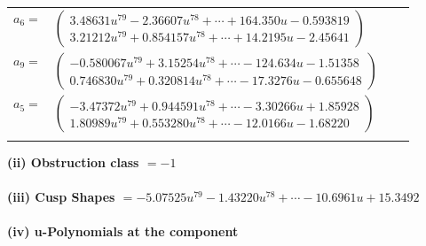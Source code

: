 \documentclass[1p]{elsarticle_modified}
\theoremstyle{definition}
\begin{document}
\begin{tabular}{m{7pt} m{180pt} m{7pt} m{180pt} }
\flushright $a_{6}=$&$\begin{pmatrix}3.48631 u^{79}-2.36607 u^{78}+\cdots+164.350 u-0.593819\\3.21212 u^{79}+0.854157 u^{78}+\cdots+14.2195 u-2.45641\end{pmatrix}$ \\
\flushright $a_{9}=$&$\begin{pmatrix}-0.580067 u^{79}+3.15254 u^{78}+\cdots-124.634 u-1.51358\\0.746830 u^{79}+0.320814 u^{78}+\cdots-17.3276 u-0.655648\end{pmatrix}$ \\
\flushright $a_{5}=$&$\begin{pmatrix}-3.47372 u^{79}+0.944591 u^{78}+\cdots-3.30266 u+1.85928\\1.80989 u^{79}+0.553280 u^{78}+\cdots-12.0166 u-1.68220\end{pmatrix}$\\&\end{tabular}
\flushleft \textbf{(ii) Obstruction class $= -1$}\\~\\
\flushleft \textbf{(iii) Cusp Shapes $= -5.07525 u^{79}-1.43220 u^{78}+\cdots-10.6961 u+15.3492$}\\~\\
\newpage\renewcommand{\arraystretch}{1}
\flushleft \textbf{(iv) u-Polynomials at the component}\newline \\
\end{document}
